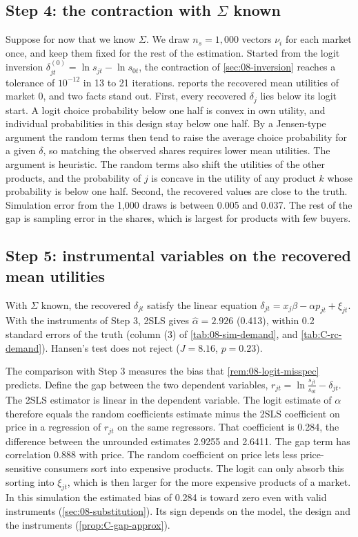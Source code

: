 \subsection{Step 4: the contraction with \texorpdfstring{$\Sigma$}{Sigma} known}\label{sec:08-worked-contraction}

Suppose for now that we know $\Sigma$. We draw $n_s = 1{,}000$ vectors $\nu_i$ for each market once, and keep them fixed
for the rest of the estimation. Started from the logit inversion $\delta^{(0)}_{jt} = \ln s_{jt} - \ln s_{0t}$, the
contraction of \cref{sec:08-inversion} reaches a tolerance of $10^{-12}$ in 13 to 21 iterations. 
reports the recovered mean utilities of market 0, and two facts stand out. First, every recovered $\delta_j$ lies below
its logit start. A logit choice probability below one half is convex in own utility, and individual probabilities in
this design stay below one half. By a Jensen-type argument the random terms then tend to raise the average choice
probability for a given $\delta$, so matching the observed shares requires lower mean utilities. The argument is
heuristic. The random terms also shift the utilities of the other products, and the probability of $j$ is concave in
the utility of any product $k$ whose probability is below one half. Second, the recovered values are close to the truth. Simulation error from the 1,000 draws is between
0.005 and 0.037. The rest of the gap is sampling error in the shares, which is largest for products with few buyers.

\subsection{Step 5: instrumental variables on the recovered mean utilities}\label{sec:08-worked-iv}

With $\Sigma$ known, the recovered $\delta_{jt}$ satisfy the linear equation $\delta_{jt} = x_j\beta - \alpha p_{jt} +
\xi_{jt}$. With the instruments of Step 3, 2SLS gives $\hat\alpha = 2.926$ (0.413), within 0.2 standard errors of the
truth (column (3) of \cref{tab:08-sim-demand}, and \cref{tab:C-rc-demand}). Hansen's test does not reject ($J = 8.16$,
$p = 0.23$).

The comparison with Step 3 measures the bias that \cref{rem:08-logit-misspec} predicts. Define the gap between the two
dependent variables, $r_{jt} = \ln\frac{s_{jt}}{s_{0t}} - \delta_{jt}$. The 2SLS estimator is linear in the dependent
variable. The logit estimate of $\alpha$ therefore equals the random coefficients estimate minus the 2SLS coefficient on
price in a regression of $r_{jt}$ on the same regressors. That coefficient is 0.284, the difference between the unrounded
estimates 2.9255 and 2.6411.
The gap term has correlation 0.888 with price. The random coefficient on price lets less price-sensitive consumers sort
into expensive products. The logit can only absorb this sorting into $\xi_{jt}$, which is then larger for the more expensive
products of a market. In this simulation the estimated bias of 0.284 is toward zero even with valid instruments
(\cref{sec:08-substitution}). Its sign depends on the model, the design and the instruments (\cref{prop:C-gap-approx}).

